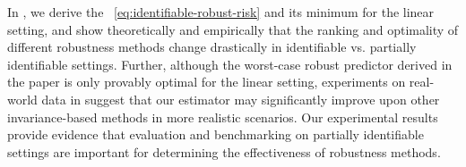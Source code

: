 In , we derive the \idRR~\eqref{eq:identifiable-robust-risk} and its minimum for the linear setting, and show theoretically and empirically that the ranking and optimality of different robustness methods change drastically in identifiable vs. partially identifiable settings.  Further, although the worst-case robust predictor derived in the paper is only provably optimal for the linear setting, experiments on real-world data in  suggest that our estimator may significantly improve upon other invariance-based methods in more realistic scenarios. 
Our experimental results provide evidence that evaluation and benchmarking on partially identifiable settings are important for determining the effectiveness of robustness methods.


